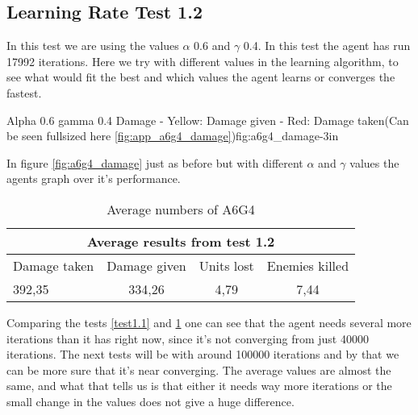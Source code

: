 \subsection*{Learning Rate Test 1.2}
In this test we are using the values $\alpha$ 0.6 and $\gamma$ 0.4. In this test the agent has run 17992 iterations. Here we try with different values in the learning algorithm, to see what would fit the best and which values the agent learns or converges the fastest.


			{Alpha 0.6 gamma 0.4 Damage - Yellow: Damage given - Red: Damage taken(Can be seen fullsized here \ref{fig:app_a6g4_damage})}{fig:a6g4_damage}{-3in}

In figure \ref{fig:a6g4_damage} just as before but with different $\alpha$ and $\gamma$ values the agents graph over it's performance.






\begin{centering}
\begin{table}
 \begin{tabular}{|l|c|c|c|}
	\multicolumn{4}{c}{Average results from test 1.2} \\
	\hline
		Damage taken & Damage given & Units lost & Enemies killed\\
	\hline
		392,35 & 334,26 & 4,79 & 7,44 \\
	\hline
\end{tabular}
\caption{Average numbers of A6G4}
\label{test1.2}
\end{table}
\end{centering}

Comparing the tests \ref{test1.1} and \ref{test1.2} one can see that the agent needs several more iterations than it has right now, since it's not converging from just 40000 iterations. The next tests will be with around 100000 iterations and by that we can be more sure that it's near converging. The average values are almost the same, and what that tells us is that either it needs way more iterations or the small change in the values does not give a huge difference.